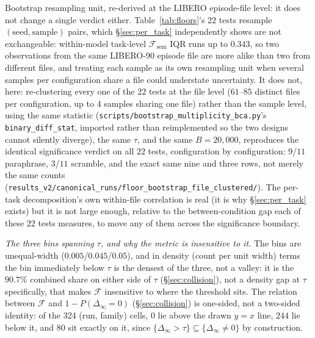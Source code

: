 Bootstrap resampling unit, re-derived at the LIBERO episode-file level: it does not change a single verdict either. Table~\ref{tab:floors}'s $22$ tests resample $(\text{seed}, \text{sample})$ pairs, which \S\ref{sec:per_task} independently shows are not exchangeable: within-model task-level $\mathcal{F}_{\text{sem}}$ IQR runs up to $0.343$, so two observations from the same LIBERO-90 episode file are more alike than two from different files, and treating each sample as its own resampling unit when several samples per configuration share a file could understate uncertainty. It does not, here: re-clustering every one of the $22$ tests at the file level ($61$--$85$ distinct files per configuration, up to $4$ samples sharing one file) rather than the sample level, using the same statistic (\texttt{scripts/\allowbreak{}bootstrap\_multiplicity\_bca.py}'s \texttt{binary\_diff\_stat}, imported rather than reimplemented so the two designs cannot silently diverge), the same $\tau$, and the same $B{=}20{,}000$, reproduces the identical significance verdict on all $22$ tests, configuration by configuration: $9$/$11$ paraphrase, $3$/$11$ scramble, and the exact same nine and three rows, not merely the same counts (\texttt{results\_v2/\allowbreak{}canonical\_runs/\allowbreak{}floor\_bootstrap\_file\_clustered/}). The per-task decomposition's own within-file correlation is real (it is why \S\ref{sec:per_task} exists) but it is not large enough, relative to the between-condition gap each of these $22$ tests measures, to move any of them across the significance boundary.

\emph{The three bins spanning $\tau$, and why the metric is insensitive to it.} The bins are unequal-width ($0.005$/$0.045$/$0.05$), and in density (count per unit width) terms the bin immediately below $\tau$ is the densest of the three, not a valley: it is the $90.7\%$ combined share on either side of $\tau$ (\S\ref{sec:collision}), not a density gap at $\tau$ specifically, that makes $\mathcal{F}$ insensitive to where the threshold sits. The relation between $\mathcal{F}$ and $1{-}P(\Delta_\infty{=}0)$ (\S\ref{sec:collision}) is one-sided, not a two-sided identity: of the 324 (run, family) cells, $0$ lie above the drawn $y{=}x$ line, $244$ lie below it, and $80$ sit exactly on it, since $\{\Delta_\infty{>}\tau\} \subseteq \{\Delta_\infty{\neq}0\}$ by construction.

